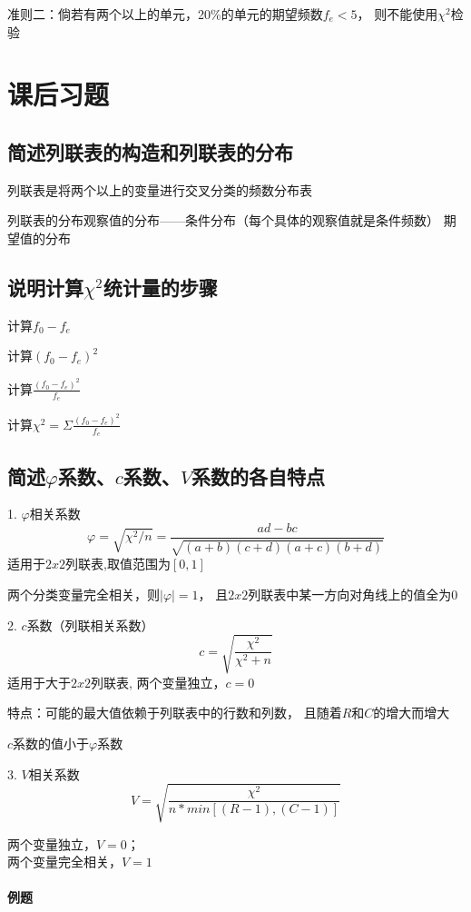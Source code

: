 \documentclass[UTF8,10pt]{book}
\begin{document}
{准则二：倘若有两个以上的单元，20\%的单元的期望频数$f_e<5$，
则不能使用$\chi^2$检验	

\section{课后习题}
{\kaishu
\subsection{简述列联表的构造和列联表的分布}	
列联表是将两个以上的变量进行交叉分类的频数分布表 

列联表的分布观察值的分布——条件分布（每个具体的观察值就是条件频数）
期望值的分布	

\subsection{说明计算$\chi^2$统计量的步骤}	

计算$f_0 -f_e$

计算$(f_0 -f_e)^2$

计算$\frac{(f_0 -f_e)^2}{f_e}$

计算$\chi^2 = \Sigma \frac{(f_0-f_e)^2}{f_e} $	



\subsection{简述$\varphi$系数、$c$系数、$V$系数的各自特点}	

1. $\varphi $相关系数 
$$\varphi = \sqrt{\chi^2/n} = \frac{ad-bc}{\sqrt{(a+b)(c+d)(a+c)(b+d)}}$$ 
适用于$2x2$列联表,取值范围为$[0,1]$

两个分类变量完全相关，则$|\varphi|=1$，
且$2x2$列联表中某一方向对角线上的值全为0 

2. $c$系数（列联相关系数） 
$$c = \sqrt{ \frac{\chi^2}{\chi^2 + n}} $$ 
适用于大于$2x2$列联表,
两个变量独立，$c=0$

特点：可能的最大值依赖于列联表中的行数和列数，
且随着$R$和$C$的增大而增大

$c$系数的值小于$\varphi$系数 

3. $V$相关系数 
$$V = \sqrt{\frac{\chi^2}{n*min[(R-1),(C-1)]}}$$ 

两个变量独立，$V=0$；\\
两个变量完全相关，$V=1$	



\paragraph{例题}

}}
\end{document}
